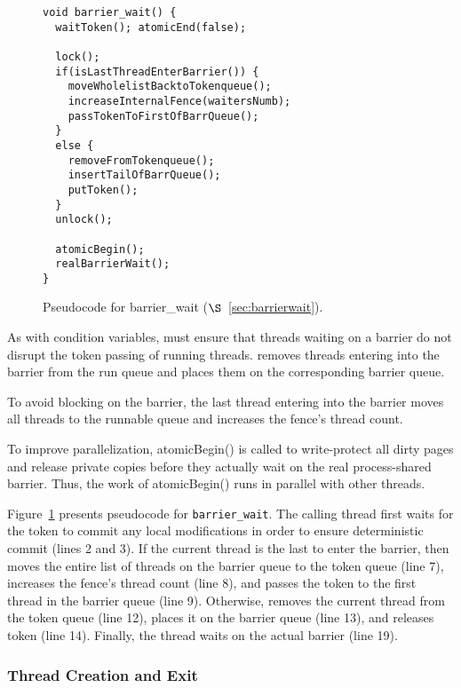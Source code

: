 \label{sec:barrierwait}

\begin{figure}
\begin{lstlisting}
void barrier_wait() {
  waitToken(); atomicEnd(false);
 
  lock();
  if(isLastThreadEnterBarrier()) {
	moveWholelistBacktoTokenqueue();
	increaseInternalFence(waitersNumb);
	passTokenToFirstOfBarrQueue();
  } 
  else {
    removeFromTokenqueue();
	insertTailOfBarrQueue();
	putToken();
  }
  unlock();

  atomicBegin();
  realBarrierWait();  
}
\end{lstlisting}
\caption{Pseudocode for barrier\_wait ($\S$~\ref{sec:barrierwait}).
\label{fig:barrierwait}}
\end{figure}

As with condition variables, \dthreads{} must ensure that threads
waiting on a barrier do not disrupt the token passing of running
threads. \dthreads{} removes threads entering into the barrier from
the run queue and places them on the corresponding barrier queue.

To avoid blocking on the barrier, the last thread entering into
the barrier moves all threads to the runnable queue and increases
the fence's thread count.

To improve parallelization, atomicBegin() is called to write-protect 
all dirty pages and release private copies before they actually wait on 
the real process-shared barrier. Thus, the work of atomicBegin() runs in parallel
with other threads. 

Figure~\ref{fig:barrierwait} presents pseudocode
for \texttt{barrier\_wait}. The calling thread first waits for the
token to commit any local modifications in order to ensure
deterministic commit (lines 2 and 3). If the current thread is the
last to enter the barrier, then \dthreads{} moves the entire list of
threads on the barrier queue to the token queue (line 7), increases
the fence's thread count (line 8), and passes the token to the first thread in the
barrier queue (line 9).  Otherwise, \dthreads{} removes the current
thread from the token queue (line 12), places it on the barrier queue
(line 13), and releases token (line 14). Finally, the thread waits on
the actual barrier (line 19).

\subsubsection{Thread Creation and Exit}

